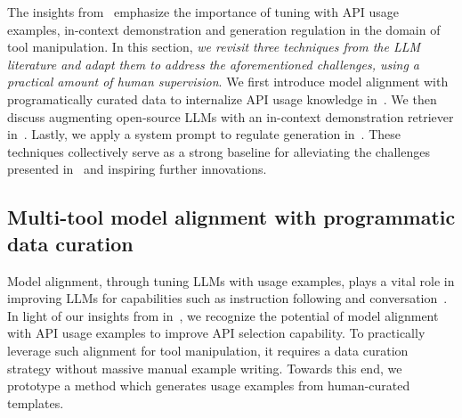 The insights from~ emphasize the importance of tuning with API usage examples, in-context demonstration and generation regulation in the domain of tool manipulation. In this section, \emph{we revisit three techniques from the LLM literature and adapt them to address the aforementioned challenges, using a practical amount of human supervision}. 
We first introduce model alignment with programatically curated data to internalize API usage knowledge in~. We then discuss augmenting open-source LLMs with an in-context demonstration retriever in~. Lastly, we apply a system prompt to regulate generation in~.
These techniques collectively serve as a strong baseline for alleviating the challenges presented in~ and inspiring further innovations.

\subsection{Multi-tool model alignment with programmatic data curation}
\label{subset:model_align}

Model alignment, through tuning LLMs with usage examples, plays a vital role in improving LLMs for capabilities such as instruction following and conversation~\cite{ouyang2022training, glaese2022improving, chung2022scaling}. 
In light of our insights from in~, we recognize the potential of model alignment with API usage examples to improve API selection capability. To practically leverage such alignment for tool manipulation, it requires a data curation strategy without massive manual example writing. Towards this end, we prototype a method which generates usage examples from human-curated templates.

